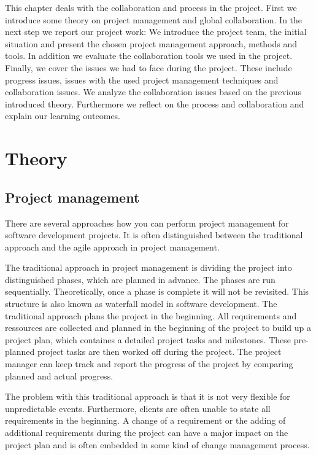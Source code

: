 This chapter deals with the collaboration and process in the project. First we introduce some theory on project management and global collaboration. In the next step we report our project work: We introduce the project team, the initial situation and present the chosen project management approach, methods and tools. In addition we evaluate the collaboration tools we used in the project. Finally, we cover the issues we had to face during the project. These include progress issues, issues with the used project management techniques and collaboration issues. We analyze the collaboration issues based on the previous introduced theory. Furthermore we reflect on the process and collaboration and explain our learning outcomes.


\section{Theory}

\subsection{Project management}

There are several approaches how you can perform project management for software development projects. It is often distinguished between the traditional approach and the agile approach in project management.

The traditional approach in project management is dividing the project into distinguished phases, which are planned in advance. The phases are run sequentially. Theoretically, once a phase is complete it will not be revisited. This structure is also known as waterfall model in software development.
The traditional approach plans the project in the beginning. All requirements and ressources are collected and planned in the beginning of the project to build up a project plan, which containes a detailed project tasks and milestones. These pre-planned project tasks are then worked off during the project. The project manager can keep track and report the progress of the project by comparing planned and actual progress.

The problem with this traditional approach is that it is not very flexible for unpredictable events. Furthermore, clients are often unable to state all requirements in the beginning. A change of a requirement or the adding of additional requirements during the project can have a major impact on the project plan and is often embedded in some kind of change management process.

